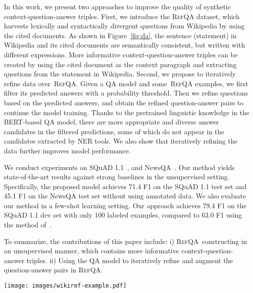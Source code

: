 \documentclass[11pt,a4paper]{article}
\newcommand\refqa{\textsc{RefQA}}
\begin{document}
In this work, we present two approaches to improve the quality of synthetic context-question-answer triples. 
First, we introduce the \refqa{} dataset, 
which harvests lexically and syntactically divergent questions from Wikipedia by using the cited documents. 
As shown in Figure~\ref{fig:da}, the sentence (statement) in Wikipedia and its cited documents are semantically consistent, but written with different expressions. 
More informative context-question-answer triples can be created by using the cited document as the context paragraph and extracting questions from the statement in Wikipedia.
Second, we propose to iteratively refine data over~\refqa{}.
Given a QA model and some~\refqa{} examples, we first filter its predicted answers with a probability threshold. Then we refine questions based on the predicted answers, and obtain the refined question-answer pairs to continue the model training.
Thanks to the pretrained linguistic knowledge in the BERT-based QA model, there are more appropriate and diverse answer candidates in the filtered predictions, some of which do not appear in the candidates extracted by NER tools.
We also show that iteratively refining the data further improves model performance.














We conduct experiments on SQuAD 1.1~\citep{squad1}, and NewsQA~\citep{newsqa2017}. Our method yields state-of-the-art results against strong baselines in the unsupervised setting. 
Specifically, the proposed model achieves 71.4 F1 on the SQuAD 1.1 test set and 45.1 F1 on the NewsQA test set without using annotated data. We also evaluate our method in a few-shot learning setting. Our approach achieves 79.4 F1 on the SQuAD 1.1 dev set with only 100 labeled examples, compared to 63.0 F1 using the method of~\citet{lewis2019unsupervisedqa}.



To summarize, the contributions of this paper include: 
i) \refqa{}~constructing in an unsupervised manner, which contains more informative context-question-answer triples.
ii) Using the QA model to iteratively refine and augment the question-answer pairs in \refqa{}.


\begin{figure*}[t]
    \centering
    \texttt{[image: images/wikiref-example.pdf]}
    \caption{Overview of \refqa{} construction.}
    \label{fig:da}
\end{figure*}
\end{document}
